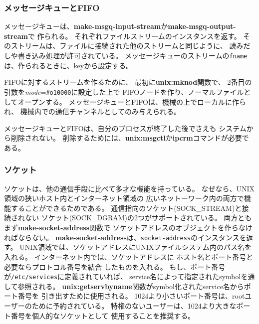\subsubsection{メッセージキューとFIFO}
メッセージキューは、{\bf make-msgq-input-stream}か{\bf make-msgq-output-stream}で
作られる。
それぞれファイルストリームのインスタンスを返す。
そのストリームは、ファイルに接続された他のストリームと同じように、
読みだしや書き込み処理が許可されている。
メッセージキューのストリームの{\tt fname}は、作られるときに、keyから設定する。

FIFOに対するストリームを作るために、
最初に{\bf unix:mknod}関数で、
2番目の引数を{\em mode}={\tt \#o10000}に設定した上で
FIFOノードを作り、ノーマルファイルとしてオープンする。
メッセージキューとFIFOは、機械の上でローカルに作られ、
機械内での通信チャンネルとしてのみ与えられる。

メッセージキューとFIFOは、自分のプロセスが終了した後でさえも
システムから削除されない。
削除するためには、{\bf unix:msgctl}か{\bf ipcrm}コマンドが必要である。

\begin{refdesc}



\end{refdesc}

\subsubsection{ソケット}
ソケットは、他の通信手段に比べて多才な機能を持っている。
なぜなら、UNIX領域の狭いホスト内とインターネット領域の
広いネットーワーク内の両方で機能することができるためである。
通信指向のソケット(SOCK\_STREAM)と接続されない
ソケット(SOCK\_DGRAM)の2つがサポートされている。
両方ともまず{\bf make-socket-address}関数で
ソケットアドレスのオブジェクトを作らなければならない。
{\bf make-socket-address}は、{\tt socket-address}のインスタンスを返す。
UNIX領域では、ソケットアドレスにUNIXファイルシステム内のパス名を
入れる。
インターネット内では、ソケットアドレスに
ホスト名とポート番号と必要ならプロトコル番号を結合
したものを入れる。
もし、ポート番号が{\tt /etc/services}に定義されていれば、
service名によって指定されたsymbolを通して参照される。
{\bf unix:getservbyname}関数がsymbol化されたservice名からポート番号を
引き出すために使用される。
1024より小さいポート番号は、rootユーザーのために予約されている。
特権のないユーザーは、1024より大きなポート番号を個人的なソケットとして
使用することを推奨する。

